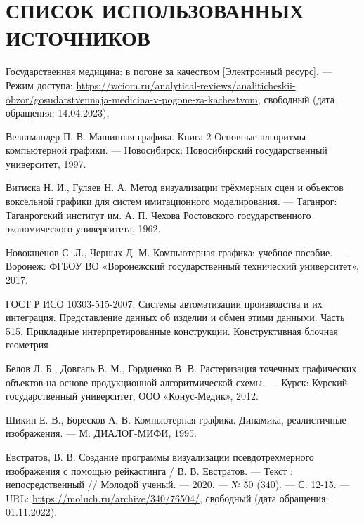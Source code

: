 \section*{СПИСОК ИСПОЛЬЗОВАННЫХ ИСТОЧНИКОВ}

\begingroup
\renewcommand{\section}[2]{}

\begin{thebibliography}{}
	Государственная медицина: в погоне за качеством [Электронный ресурс]. --- Режим доступа: \url{https://wciom.ru/analytical-reviews/analiticheskii-obzor/gosudarstvennaja-medicina-v-pogone-za-kachestvom}, свободный (дата обращения: 14.04.2023),


	Вельтмандер П. В. Машинная графика. Книга 2 Основные алгоритмы компьютерной графики. --- Новосибирск: Новосибирский государственный университет, 1997.

	Витиска Н. И., Гуляев Н. А. Метод визуализации трёхмерных сцен и объектов воксельной графики для систем имитационного моделирования. --- Таганрог: Таганрогский институт им. А. П. Чехова Ростовского государственного экономического университета, 1962.

	Новокщенов С. Л., Черных Д. М. Компьютерная графика: учебное пособие. --- Воронеж: ФГБОУ ВО
	«Воронежский государственный технический университет», 2017.

	ГОСТ Р ИСО 10303-515-2007. Системы автоматизации производства и их интеграция. Представление данных об изделии и обмен этими данными. Часть 515. Прикладные интерпретированные конструкции. Конструктивная блочная геометрия

	Белов Л. Б., Довгаль В. М., Гордиенко В. В. Растеризация точечных графических объектов на основе продукционной алгоритмической схемы. --- Курск: Курский государственный университет, ООО «Конус-Медик», 2012.

	Шикин Е. В., Боресков А. В. Компьютерная графика. Динамика, реалистичные изображения. --- М: ДИАЛОГ-МИФИ, 1995.

	Евстратов, В. В. Создание программы визуализации псевдотрехмерного изображения с помощью рейкастинга / В. В. Евстратов. — Текст : непосредственный // Молодой ученый. — 2020. — № 50 (340). — С. 12-15. — URL: \url{https://moluch.ru/archive/340/76504/}, свободный (дата обращения: 01.11.2022).


\end{thebibliography}
